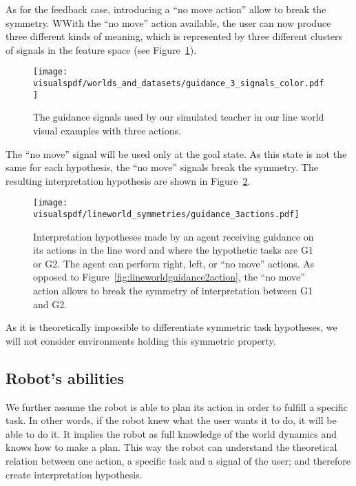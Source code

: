 As for the feedback case, introducing a ``no move action'' allow to break the symmetry. WWith the ``no move'' action available, the user can now produce three different kinds of meaning, which is represented by three different clusters of signals in the feature space (see Figure~\ref{fig:lineworldguidance3signals}). 

\begin{figure}[!htbp]
  \centering
  \texttt{[image: \\visualspdf/worlds\_and\_datasets/guidance\_3\_signals\_color.pdf]}
  \caption{The guidance signals used by our simulated teacher in our line world visual examples with three actions.}
  \label{fig:lineworldguidance3signals}
\end{figure}

The ``no move'' signal will be used only at the goal state. As this state is not the same for each hypothesis, the ``no move'' signals break the symmetry. The resulting interpretation hypothesis are shown in Figure~\ref{fig:lineworldguidance3action}.

\begin{figure}[!htbp]
  \centering
  \texttt{[image: \\visualspdf/lineworld\_symmetries/guidance\_3actions.pdf]}
  \caption{Interpretation hypotheses made by an agent receiving guidance on its actions in the line word and where the hypothetic tasks are G1 or G2. The agent can perform right, left, or ``no move'' actions. As opposed to Figure~\ref{fig:lineworldguidance2action}, the ``no move'' action allows to break the symmetry of interpretation between G1 and G2.}
  \label{fig:lineworldguidance3action}
\end{figure}

\transition

As it is theoretically impossible to differentiate symmetric task hypotheses, we will not consider environments holding this symmetric property.

\subsection{Robot's abilities}

We further assume the robot is able to plan its action in order to fulfill a specific task. In other words, if the robot knew what the user wants it to do, it will be able to do it. It implies the robot as full knowledge of the world dynamics and knows how to make a plan. This way the robot can understand the theoretical relation between one action, a specific task and a signal of the user; and therefore create interpretation hypothesis.

